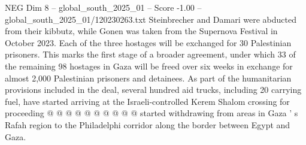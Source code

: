 \begin{textsample}{NEG Dim 8 – global\_south\_2025\_01 – Score -1.00 – global\_south\_2025\_01/120230263.txt}
Steinbrecher and Damari were abducted from their kibbutz, while Gonen was taken from the Supernova Festival in October 2023.
Each of the three hostages will be exchanged for 30 Palestinian prisoners.
This marks the first stage of a broader agreement, under which 33 of the remaining 98 hostages in Gaza will be freed over six weeks in exchange for almost 2,000 Palestinian prisoners and detainees.
As part of the humanitarian provisions included in the deal, several hundred aid trucks, including 20 carrying fuel, have started arriving at the Israeli-controlled Kerem Shalom crossing for proceeding @ @ @ @ @ @ @ @ @ @ started withdrawing from areas in Gaza ' s Rafah region to the Philadelphi corridor along the border between Egypt and Gaza.

\end{textsample}
